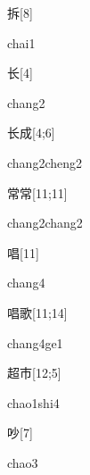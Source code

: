 \begin{verbete}[chai1]{拆}[8]
\begin{pronuncia}{chai1}
\end{pronuncia}
\end{verbete}

\begin{verbete}[chang2]{长}[4]
\begin{pronuncia}{chang2}
\end{pronuncia}
\end{verbete}

\begin{verbete}{长成}[4;6]
\begin{pronuncia}{chang2cheng2}
\end{pronuncia}
\end{verbete}

\begin{verbete}{常常}[11;11]
\begin{pronuncia}{chang2chang2}
\end{pronuncia}
\end{verbete}

\begin{verbete}[chang4]{唱}[11]
\begin{pronuncia}{chang4}
\end{pronuncia}
\end{verbete}

\begin{verbete}[chang4ge1]{唱歌}[11;14]
\begin{pronuncia}{chang4ge1}
\end{pronuncia}
\end{verbete}

\begin{verbete}{超市}[12;5]
\begin{pronuncia}{chao1shi4}
\end{pronuncia}
\end{verbete}

\begin{verbete}[chao3]{吵}[7]
\begin{pronuncia}{chao3}
\end{pronuncia}
\end{verbete}

